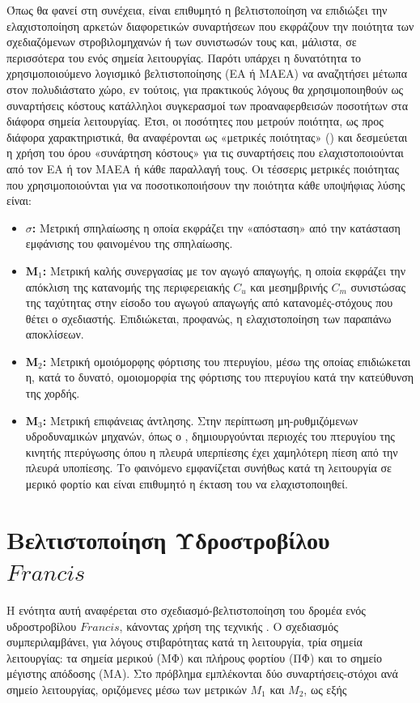Όπως θα φανεί στη συνέχεια, είναι επιθυμητό η βελτιστοποίηση  να επιδιώξει την ελαχιστοποίηση αρκετών διαφορετικών συναρτήσεων που εκφράζουν την ποιότητα των σχεδιαζόμενων στροβιλομηχανών ή των συνιστωσών τους και, μάλιστα, σε περισσότερα του ενός σημεία λειτουργίας. Παρότι υπάρχει η δυνατότητα το χρησιμοποιούμενο λογισμικό βελτιστοποίησης (ΕΑ ή ΜΑΕΑ) να αναζητήσει μέτωπα  στον πολυδιάστατο χώρο, εν τούτοις, για πρακτικούς λόγους θα χρησιμοποιηθούν ως συναρτήσεις κόστους κατάλληλοι συγκερασμοί των προαναφερθεισών ποσοτήτων στα διάφορα σημεία λειτουργίας. Έτσι, οι ποσότητες που μετρούν ποιότητα, ως προς διάφορα χαρακτηριστικά, θα αναφέρονται ως «μετρικές ποιότητας» () και δεσμεύεται η χρήση του όρου «συνάρτηση κόστους» για τις συναρτήσεις που ελαχιστοποιούνται από τον ΕΑ ή τον ΜΑΕΑ ή κάθε παραλλαγή τους.   
Οι τέσσερις μετρικές ποιότητας που χρησιμοποιούνται για να ποσοτικοποιήσουν την ποιότητα κάθε υποψήφιας λύσης είναι: 
\begin{itemize}
\item{\textbf{$\sigma$:}} Μετρική σπηλαίωσης η οποία εκφράζει την «απόσταση» από την κατάσταση εμφάνισης του φαινομένου της σπηλαίωσης. 
\item{\textbf{M$_1$:}} Μετρική καλής συνεργασίας με τον αγωγό απαγωγής, η οποία εκφράζει την απόκλιση της κατανομής της περιφερειακής $C_u$ και μεσημβρινής $C_m$ συνιστώσας της ταχύτητας στην είσοδο του αγωγού απαγωγής από κατανομές-στόχους που θέτει ο σχεδιαστής. Επιδιώκεται, προφανώς, η ελαχιστοποίηση των παραπάνω αποκλίσεων.
\item{\textbf{M$_2$:}} Μετρική ομοιόμορφης φόρτισης του πτερυγίου, μέσω της οποίας επιδιώκεται η, κατά το δυνατό, ομοιομορφία της φόρτισης του πτερυγίου κατά την κατεύθυνση της χορδής.
\item{\textbf{M$_3$:}} Μετρική επιφάνειας άντλησης. Στην περίπτωση μη-ρυθμιζόμενων υδροδυναμικών μηχανών, όπως ο , δημιουργούνται περιοχές του πτερυγίου της κινητής πτερύγωσης όπου η πλευρά υπερπίεσης έχει χαμηλότερη πίεση  από την πλευρά υποπίεσης. Το φαινόμενο εμφανίζεται συνήθως κατά τη λειτουργία σε μερικό φορτίο και είναι επιθυμητό  η έκταση του να ελαχιστοποιηθεί.   
\end{itemize}

\section{Βελτιστοποίηση Υδροστροβίλου $Francis$}
Η ενότητα αυτή αναφέρεται στο σχεδιασμό-βελτιστοποίηση του δρομέα ενός υδροστροβίλου $Francis$, κάνοντας χρήση της τεχνικής . Ο σχεδιασμός συμπεριλαμβάνει, για λόγους στιβαρότητας κατά τη λειτουργία, τρία σημεία λειτουργίας: τα σημεία  μερικού (ΜΦ) και πλήρους φορτίου (ΠΦ) και το σημείο μέγιστης απόδοσης (ΜΑ). Στο πρόβλημα εμπλέκονται δύο συναρτήσεις-στόχοι ανά σημείο λειτουργίας, οριζόμενες μέσω των μετρικών $M_1$ και $M_2$, ως εξής 

